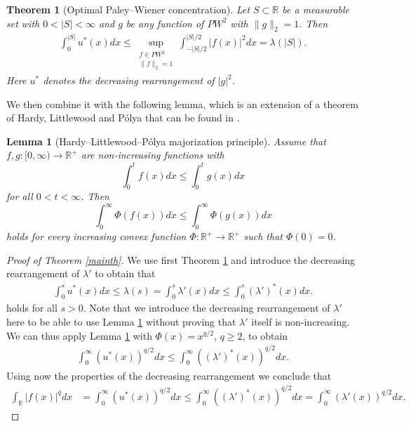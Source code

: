 \documentclass[11pt, a4paper, reqno]{amsart}
\newtheorem{theorem}{Theorem}
\newtheorem{lemma}{Lemma}
\theoremstyle{remark}
\begin{document}
\begin{theorem}[Optimal Paley–Wiener concentration]
\label{OptimalPWConcentration}
Let $S \subset \mathbb{R}$ be a measurable set with $0 < |S| < \infty$ and $g$ be any function of $PW^2$ with $\|g\|_{2}=1$. Then
\begin{align*}
     \int_{0}^{|S|}u^{*}(x) dx \leq \sup_{\substack{f\in PW^2\\ \|f\|_2=1}} \int_{-|S|/2}^{|S|/2}|f(x)|^2 dx = \lambda(|S|).
\end{align*}
Here $u^{*}$ denotes the decreasing rearrangement of $|g|^2$.
\end{theorem}

We then combine it with the following lemma, which is an extension of a theorem of Hardy, Littlewood and Pólya that can be found in \cite[Theorem 2.1]{Chong_1974}.
\begin{lemma}[Hardy--Littlewood--Pólya majorization principle]\label{HLP}
    Assume that $f,g: [0, \infty) \xrightarrow{} \mathbb{R}^{+}$ are non-increasing functions with 
    \begin{equation}
    \label{eq:majorization}
    \int_0^t f(x) dx \leq \int_0^t g(x)dx
    \end{equation}
    for all $0<t< \infty$.
    Then 
    $$\int_0^{\infty} \Phi(f(x))dx \leq \int_0^{\infty} \Phi(g(x))dx$$
    holds for every increasing convex function $\Phi: \mathbb{R}^{+} \xrightarrow{} \mathbb{R}^{+}$ such that $\Phi(0) = 0$.
\end{lemma}

\begin{proof}[Proof of Theorem \ref{mainth}]
We use first Theorem \ref{OptimalPWConcentration} and introduce the decreasing rearrangement of $\lambda'$ to obtain that 
\begin{align*}
     \int_{0}^{s}u^{*}(x) dx \leq \lambda(s) =  \int_{0}^s \lambda'(x)dx \leq \int_{0}^s (\lambda')^{*}(x)dx.
\end{align*}
holds for all $s > 0$. 
Note that we introduce the decreasing rearrangement of $\lambda'$ here to be able to use Lemma \ref{HLP} without proving that $\lambda'$ itself is non-increasing. 
We can thus apply Lemma \ref{HLP} with $\Phi(x) = x^{q/2}$, $q\geq 2$, to obtain
\begin{align*}
     \int_{0}^{\infty}(u^{*}(x))^{q/2} dx \leq \int_{0}^{\infty} ((\lambda')^{*}(x))^{q/2}dx.
\end{align*}
Using now the properties of the decreasing rearrangement we conclude that 
\begin{align*}
    \int_{\mathbb{R}}|f(x)|^q dx &= \int_0^{\infty} (u^{*}(x))^{q/2}dx \leq \int_{0}^{\infty} ((\lambda')^{*}(x))^{q/2}dx = \int_{0}^{\infty} (\lambda'(x))^{q/2}dx.
    \end{align*}
\end{proof}
\end{document}
